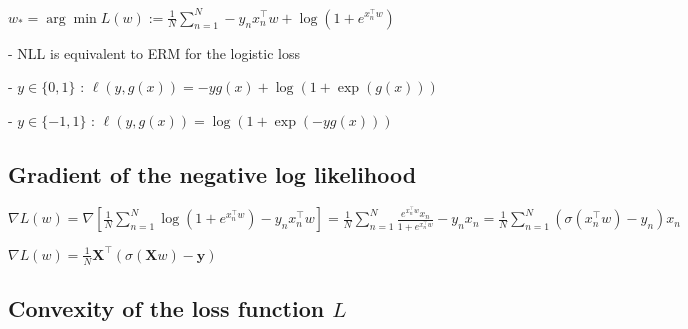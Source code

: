 $
w_{*}=\arg \min L(w) :=\frac{1}{N} \sum_{n=1}^{N}-y_{n} x_{n}^{\top} w+\log \left(1+e^{x_{n}^{\top} w}\right)
$

- NLL is equivalent to ERM for the logistic loss 

- $y \in\{0,1\}$ :
$
\ell(y, g(x))=-y g(x)+\log (1+\exp (g(x)))
$

- $y \in\{-1,1\}$ :
$
\ell(y, g(x))=\log (1+\exp (-y g(x)))
$


\subsection*{Gradient of the negative log likelihood}

$\nabla L(w)=\nabla\left[\frac{1}{N} \sum_{n=1}^{N} \log \left(1+e^{x_{n}^{\top} w}\right)-y_{n} x_{n}^{\top} w\right]=\frac{1}{N} \sum_{n=1}^{N} \frac{e^{x_{n}^{\top} w} x_{n}}{1+e^{x_{n}^{\top} w}}-y_{n} x_{n}=\frac{1}{N} \sum_{n=1}^{N}\left(\sigma\left(x_{n}^{\top} w\right)-y_{n}\right) x_{n}$

$
\nabla L(w)=\frac{1}{N} \mathbf{X}^{\top}(\sigma(\mathbf{X} w)-\mathbf{y})
$



\subsection*{Convexity of the loss function $L$}







